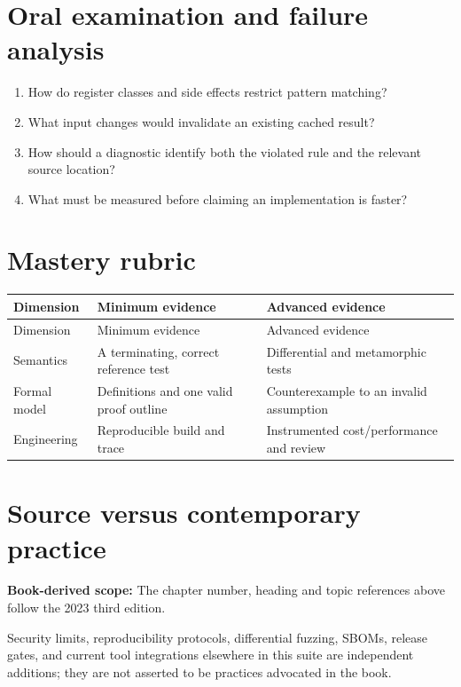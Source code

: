 \documentclass[10pt,letterpaper]{article}
\begin{document}
\section{Oral examination and failure analysis}
\begin{enumerate}
\item How do register classes and side effects restrict pattern matching?
\item What input changes would invalidate an existing cached result?
\item How should a diagnostic identify both the violated rule and the relevant source location?
\item What must be measured before claiming an implementation is faster?
\end{enumerate}

\section{Mastery rubric}
\begin{longtable}{|>{\raggedright\arraybackslash}p{}|>{\raggedright\arraybackslash}p{}|>{\raggedright\arraybackslash}p{}|}
\hline
Dimension & Minimum evidence & Advanced evidence\\ \hline\endfirsthead
\hline
Dimension & Minimum evidence & Advanced evidence\\ \hline\endhead
Semantics & A terminating, correct reference test & Differential and metamorphic tests\\ \hline
Formal model & Definitions and one valid proof outline & Counterexample to an invalid assumption\\ \hline
Engineering & Reproducible build and trace & Instrumented cost/performance and review\\ \hline
\end{longtable}

\section{Source versus contemporary practice}
\textbf{Book-derived scope:} The chapter number, heading and topic references above follow the 2023 third edition.\par\modern Security limits, reproducibility protocols, differential fuzzing, SBOMs, release gates, and current tool integrations elsewhere in this suite are independent additions; they are not asserted to be practices advocated in the book.
\end{document}
